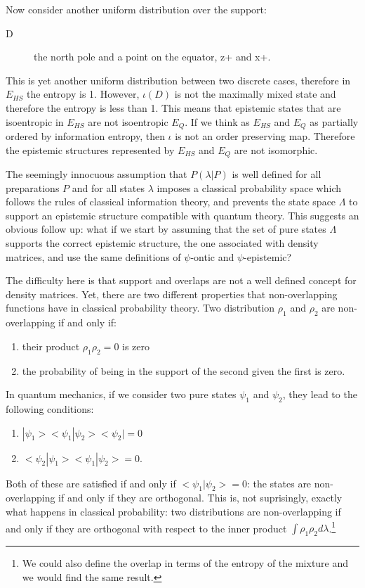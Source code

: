 \documentclass[twocolumn,prl,floatfix,superscriptaddress]{revtex4-2}
\begin{document}
Now consider another uniform distribution over the support:
\begin{description}
	\item[D] the north pole and a point on the equator, z+ and x+.
\end{description}
This is yet another uniform distribution between two discrete cases, therefore in $E_{HS}$ the entropy is 1. However, $\iota(D)$ is not the maximally mixed state and therefore the entropy is less than 1. This means that epistemic states that are isoentropic in $E_{HS}$ are not isoentropic $E_{Q}$. If we think as $E_{HS}$ and $E_{Q}$ as partially ordered by information entropy, then $\iota$ is not an order preserving map. Therefore the epistemic structures represented by $E_{HS}$ and $E_{Q}$ are not isomorphic.

The seemingly innocuous assumption that $P(\lambda|P)$ is well defined for all preparations $P$ and for all states $\lambda$ imposes a classical probability space which follows the rules of classical information theory, and prevents the state space $\Lambda$ to support an epistemic structure compatible with quantum theory. This suggests an obvious follow up: what if we start by assuming that the set of pure states $\Lambda$ supports the correct epistemic structure, the one associated with density matrices, and use the same definitions of $\psi$-ontic and $\psi$-epistemic?

The difficulty here is that support and overlaps are not a well defined concept for density matrices. Yet, there are two different properties that non-overlapping functions have in classical probability theory. Two distribution $\rho_1$ and $\rho_2$ are non-overlapping if and only if:
\begin{enumerate}
	\item their product $\rho_1 \rho_2 = 0$ is zero
	\item the probability of being in the support of the second given the first is zero.
\end{enumerate}
In quantum mechanics, if we consider two pure states $\psi_1$ and $\psi_2$, they lead to the following conditions:
\begin{enumerate}
	\item $|\psi_1><\psi_1|\psi_2><\psi_2| = 0$
	\item $<\psi_2|\psi_1><\psi_1|\psi_2> = 0$.
\end{enumerate}
Both of these are satisfied if and only if $<\psi_1|\psi_2>=0$: the states are non-overlapping if and only if they are orthogonal. This is, not suprisingly, exactly what happens in classical probability: two distributions are non-overlapping if and only if they are orthogonal with respect to the inner product $\int \rho_1 \rho_2 d\lambda$.\footnote{We could also define the overlap in terms of the entropy of the mixture and we would find the same result.}
\end{document}
